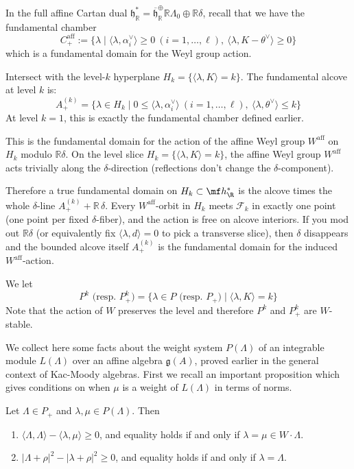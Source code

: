 \documentclass[12pt]{article}
\begin{document}
\begin{remark}
    In the full affine Cartan dual $\mathfrak{h}_\mathbb{R}^*=\overline{\mathfrak{h}}_\mathbb{R}^\oplus \mathbb{R}\Lambda_0\oplus \mathbb{R}\delta$, recall that we have the fundamental chamber
    \[C_+^{\text{aff}} := \{\lambda \mid \langle \lambda,\alpha_i^\vee\rangle\ge 0\ (i=1,\dots,\ell),\ \langle \lambda,K-\theta^\vee\rangle\ge 0\}\] which is a fundamental domain for the Weyl group action.

    Intersect with the level-$k$ hyperplane $H_k=\{\langle \lambda,K\rangle=k\}$. The fundamental alcove at level $k$ is:
    \[A_+^{(k)} = \{\lambda\in H_k \mid 0\le \langle \lambda,\alpha_i^\vee\rangle\ (i=1,\dots,\ell),\ \langle \lambda,\theta^\vee\rangle\le k\}\]
    At level $k=1$, this is exactly the fundamental chamber defined earlier.

    This is the fundamental domain for the action of the affine Weyl group $W^{\text{aff}}$ on $H_k$ modulo $\mathbb{R}\delta$. On the level slice $H_k=\{\langle\lambda,K\rangle=k\}$, the affine Weyl group $W^{\text{aff}}$ acts trivially along the $\delta$-direction (reflections don't change the $\delta$-component).

    Therefore a true fundamental domain on $H_k \subset \mf h^*_{\R}$ is the alcove times the whole $\delta$-line $A_+^{(k)} + \mathbb{R}\,\delta$. Every $W^{\text{aff}}$-orbit in $H_k$ meets $\mathcal{F}_k$ in exactly one point (one point per fixed $\delta$-fiber), and the action is free on alcove interiors. If you mod out $\mathbb{R}\delta$ (or equivalently fix $\langle\lambda,d\rangle=0$ to pick a transverse slice), then $\delta$ disappears and the bounded alcove itself $A_+^{(k)}$ is the fundamental domain for the induced $W^{\text{aff}}$-action.
\end{remark}

We let
\[P^k \text{ (resp. } P^k_+) = \{ \lambda \in P \text{ (resp. } P_+) \mid \langle \lambda, K \rangle = k \}\] Note that the action of $W$ preserves the level and therefore $P^k$ and $P_+^k$ are $W$-stable.


We collect here some facts about the weight system $P(\Lambda)$ of an integrable module $L(\Lambda)$ over an affine algebra $\mathfrak{g}(A)$, proved earlier in the general context of Kac-Moody algebras. First we recall an important proposition which gives conditions on when $\mu$ is a weight of $L(\Lambda)$ in terms of norms.

\begin{proposition}
    Let $\Lambda \in P_+$ and $\lambda, \mu \in P(\Lambda)$. Then
    \begin{enumerate}
        \item $\langle \Lambda, \Lambda \rangle - \langle \lambda, \mu \rangle \ge 0$, and equality holds if and only if $\lambda = \mu \in W \cdot \Lambda$.
        \item $|\Lambda + \rho|^2 - |\lambda + \rho|^2 \ge 0$, and equality holds if and only if $\lambda = \Lambda$.
    \end{enumerate}
\end{proposition}
\end{document}
